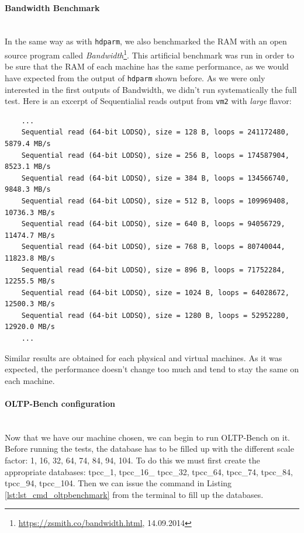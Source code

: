 \paragraph{Bandwidth Benchmark}\mbox{}\\
In the same way as with \texttt{hdparm}, we also benchmarked the RAM with an open source program called \textit{Bandwidth}\footnote{\url{https://zsmith.co/bandwidth.html}, 14.09.2014}. 
This artificial benchmark was run in order to be sure that the RAM of each machine has the same performance, as we would have expected from the output of \texttt{hdparm} shown before.
As we were only interested in the first outputs of Bandwidth, we didn't run systematically the full test. Here is an excerpt of Sequentialial reads output from \texttt{vm2} with \textit{large} flavor:

\begingroup
	\singlespacing
    \fontsize{10pt}{12pt}\selectfont
\begin{verbatim}
    ...
    Sequential read (64-bit LODSQ), size = 128 B, loops = 241172480, 5879.4 MB/s
    Sequential read (64-bit LODSQ), size = 256 B, loops = 174587904, 8523.1 MB/s
    Sequential read (64-bit LODSQ), size = 384 B, loops = 134566740, 9848.3 MB/s
    Sequential read (64-bit LODSQ), size = 512 B, loops = 109969408, 10736.3 MB/s
    Sequential read (64-bit LODSQ), size = 640 B, loops = 94056729, 11474.7 MB/s
    Sequential read (64-bit LODSQ), size = 768 B, loops = 80740044, 11823.8 MB/s
    Sequential read (64-bit LODSQ), size = 896 B, loops = 71752284, 12255.5 MB/s
    Sequential read (64-bit LODSQ), size = 1024 B, loops = 64028672, 12500.3 MB/s
    Sequential read (64-bit LODSQ), size = 1280 B, loops = 52952280, 12920.0 MB/s
    ...
\end{verbatim}
\endgroup

Similar results are obtained for each physical and virtual machines. 
As it was expected, the performance doesn't change too much and tend to stay the same on each machine.

\paragraph{OLTP-Bench configuration}\mbox{}\\
Now that we have our machine chosen, we can begin to run OLTP-Bench on it. 
Before running the tests, the database has to be filled up with the different scale factor: 1, 16, 32, 64, 74, 84, 94, 104. 
To do this we must first create the appropriate databases: tpcc\_1, tpcc\_16\_ tpcc\_32, tpcc\_64, tpcc\_74, tpcc\_84, tpcc\_94, tpcc\_104. 
Then we can issue the command in Listing \ref{lst:lst_cmd_oltpbenchmark} from the terminal to fill up the databases.

